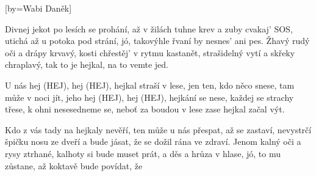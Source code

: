 [by={Wabi Daněk}]

\beginverse{}
Divnej jekot po lesích se prohání,
až v žilách tuhne krev a zuby cvakaj' SOS,
utichá až u potoka pod strání,
jó, takovýhle řvaní by nesnes' ani pes.
Žhavý rudý oči a drápy krvavý,
kosti chřestěj' v rytmu kastanět,
strašidelný vytí a skřeky chraplavý,
tak to je hejkal, na to vemte jed.
\endverse{}

\beginchorus{}
U nás hej (HEJ), hej (HEJ), hejkal straší v lese,
jen ten, kdo něco snese, tam může v noci jít,
jeho hej (HEJ), hej (HEJ), hejkání se nese,
každej se strachy třese, k ohni nesesedneme se,
neboť za boudou v lese zase hejkal začal výt.
\endchorus{}

\beginverse{}
Kdo z vás tady na hejkaly nevěří,
ten může u nás přespat, až se zastaví,
nevystrčí špičku nosu ze dveří
a bude jásat, že se dožil rána ve zdraví.
Jenom kalný oči a rysy ztrhané,
kalhoty si bude muset prát,
a děs a hrůza v hlase, jó, to mu zůstane,
až koktavě bude povídat, že
\endverse{}

\beginchorus{}
\phantom{}
\endchorus{}

\endsong{}
